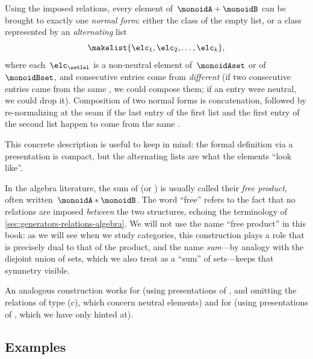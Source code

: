 \begin{remark}
    \label{rem:sum-normal-form}
    Using the imposed relations, every element of~$\monoidA + \monoidB$ can be brought to exactly one \emph{normal form}: either the class of the empty list, or a class represented by an \emph{alternating} list
    \begin{equation}
        \makelist{\elc_1, \elc_2, \dots, \elc_k},
    \end{equation}
    where each~$\elc_\setIel$ is a non-neutral element of~$\monoidAset$ or of~$\monoidBset$, and consecutive entries come from \emph{different}  (if two consecutive entries came from the same , we could compose them; if an entry were neutral, we could drop it).
    Composition of two normal forms is concatenation, followed by re-normalizing at the seam if the last entry of the first list and the first entry of the second list happen to come from the same .

    This concrete description is useful to keep in mind: the formal definition via a presentation is compact, but the alternating lists are what the elements ``look like''.
\end{remark}

\begin{remark}[Terminology]
    \label{rem:free-product-name}
    In the algebra literature, the sum of  (or ) is usually called their \emph{free product}, often written~$\monoidA * \monoidB$.
    The word ``free'' refers to the fact that no relations are imposed \emph{between} the two structures, echoing the terminology of \cref{sec:generators-relations-algebra}.
    We will not use the name ``free product'' in this book: as we will see when we study categories, this construction plays a role that is precisely dual to that of the product, and the name \emph{sum}---by analogy with the disjoint union of sets, which we also treat as a ``sum'' of sets---keeps that symmetry visible.
\end{remark}

\begin{remark}
    An analogous construction works for  (using presentations of , and omitting the relations of type (c), which concern neutral elements) and for  (using presentations of , which we have only hinted at).
\end{remark}

\subsection{Examples}

